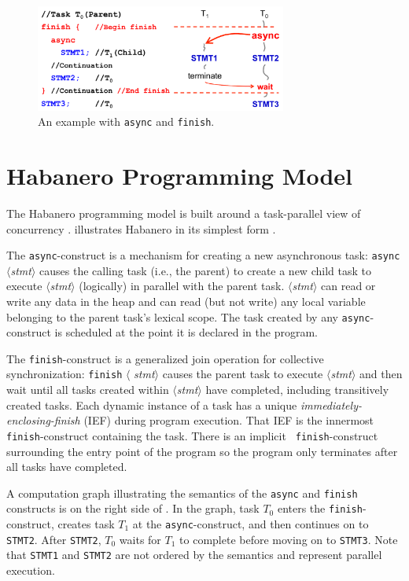 \begin{figure}[t]
\centering
\includegraphics[width=3.25in]{../figs/async-finish}
\caption{An example with {\tt async} and {\tt finish}.}
\label{fig:async-finish}
\end{figure}


\section{Habanero Programming Model}

The Habanero programming model is built around a task-parallel view of
concurrency \cite{Cave:2011:HNA:2093157.2093165}.  illustrates Habanero in its
simplest form \cite{Cave:2011:HNA:2093157.2093165}.

The \texttt{async}-construct is a mechanism for
creating a new asynchronous task: {\tt async}
$\langle${\em stmt}$\rangle$ causes the calling task (i.e., the
parent) to create a new child task to execute {\em
  $\langle$stmt$\rangle$} (logically) in parallel with the parent
task. {\em $\langle$stmt$\rangle$} can read or write any data in the
heap and can read (but not write) any local variable belonging to the
parent task's lexical scope. The task created by any
\texttt{async}-construct is scheduled at the point it is declared in
the program.

The \texttt{finish}-construct is a generalized join operation for
collective synchronization: {\tt finish} $\langle${\em
  stmt}$\rangle$ causes the parent task to execute {\em
  $\langle$stmt$\rangle$} and then wait until all tasks created within
{\em $\langle$stmt$\rangle$} have completed, including transitively
created tasks.  Each dynamic instance of a task has a unique {\em
  immediately-enclosing-finish} (IEF) during program execution. That IEF is the
innermost {\tt finish}-construct containing the task.  There is an implicit {\tt
  finish}-construct surrounding the entry point of the program so the program only terminates after
all tasks have completed.

A computation graph illustrating the semantics of the \texttt{async}
and \texttt{finish} constructs is on the right side of
. In the graph, task $T_0$ enters the
\texttt{finish}-construct, creates task $T_1$ at the
\texttt{async}-construct, and then continues on to
\texttt{STMT2}. After \texttt{STMT2}, $T_0$ waits for $T_1$ to
complete before moving on to \texttt{STMT3}. Note that \texttt{STMT1}
and \texttt{STMT2} are not ordered by the semantics and represent
parallel execution.

